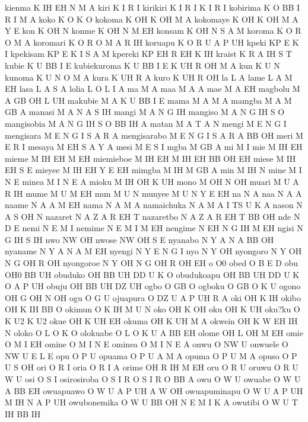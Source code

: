   kienma K IH EH N M A
  kiri K I R I
  kirikiri K I R I K I R I
  kobirima K O BB I R I M A
  koko K O K O
  kokoma K OH K OH M A
  kokomaye K OH K OH M A Y E
  kon K OH N
  konme K OH N M EH
  konsam K OH N S A M
  koroma K O R O M A
  koromari K O R O M A R IH
  koruapu K O R U A P UH
  kpeki KP E K I
  kpekisam KP E K I S A M
  kpereki KP EH R EH K IH
  kraist K R A IH S T
  kubie K U BB I E
  kubiekuroma K U BB I E K UH R OH M A
  kun K U N
  kunoma K U N O M A
  kura K UH R A
  kuro K UH R OH
  la L A
  lame L A M EH
  lasa L A S A
  lolia L O L I A
  ma M A
  maa M A A
  mae M A EH
  magbolu M A GB OH L UH
  makubie M A K U BB I E
  mama M A M A
  mamgba M A M GB A
  manasi M A N A S IH
  mangi M A N G IH
  mangiso M A N G IH S O
  mangisobia M A N G IH S O BB IH A
  matan M A T A N
  mengi M E N G I
  mengisara M E N G I S A R A
  mengisarabo M E N G I S A R A BB OH
  meri M E R I
  mesaya M EH S A Y A
  mesi M E S I
  mgba M GB A
  mi M I
  mie M IH EH
  mieme M IH EH M EH
  miemieboe M IH EH M IH EH BB OH EH
  miese M IH EH S E
  mieyee M IH EH Y E EH
  mimgba M IH M GB A
  min M IH N
  mine M I N E
  minea M I N E A
  mioku M IH OH K UH
  mono M OH N OH
  muari M U A R IH
  mume M U M EH
  mun M U N
  munyee M U N Y E EH
  na N A
  naa N A A
  naame N A A M EH
  nama N A M A
  namaichuka N A M A I TS U K A
  nason N A S OH N
  nazaret N A Z A R EH T
  nazaretbo N A Z A R EH T BB OH
  nde N D E
  nemi N E M I
  nemime N E M I M EH
  nengime N EH N G IH M EH
  ngisi N G IH S IH
  nwo NW OH
  nwose NW OH S E
  nyanabo N Y A N A BB OH
  nyaname N Y A N A M EH
  nyengi N Y E N G I
  nyo N Y OH
  nyongoro N Y OH N G OH R OH
  nyongoroe N Y OH N G OH R OH EH
  o O0
  obed O B E D
  obu OH0 BB UH
  obuduko OH BB UH DD U K O
  obudukoapu OH BB UH DD U K O A P UH
  obuju OH BB UH DZ UH
  ogbo O GB O
  ogboku O GB O K U
  ogono OH G OH N OH
  ogu O G U
  ojuapura O DZ U A P UH R A
  oki OH K IH
  okibo OH K IH BB O
  okimun O K IH M U N
  oko OH K OH
  oku OH K UH
  oku?ku O K U2 K U2
  okue OH K UH EH
  okuma OH K UH M A
  okwein OH K W EH IH N
  oloko O L O K O
  olokuabe O L O K U A BB EH
  olome OH L OH M EH
  omie O M I EH
  omine O M I N E
  ominea O M I N E A
  onwu O NW U
  onwuele O NW U E L E
  opu O P U
  opuama O P U A M A
  opuma O P U M A
  opuso O P U S OH
  ori O R I
  oria O R I A
  orime OH R IH M EH
  oru O R U
  oruwu O R U W U
  osi O S I
  osirosiroba O S I R O S I R O BB A
  owu O W U
  owuabe O W U A BB EH
  owuapuawo O W U A P UH A W OH
  owuapuminapu O W U A P UH M IH N A P UH
  owubonemika O W U BB OH N E M I K A
  owutibi O W U T IH BB IH
